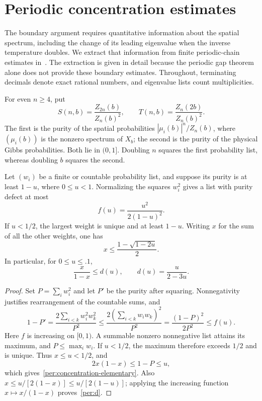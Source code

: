 \section{Periodic concentration estimates}\label{sec:periodic}

The boundary argument requires quantitative information about the
spatial spectrum, including the change of its leading eigenvalue when
the inverse temperature doubles.  We extract that information from
finite periodic-chain estimates in~\cite{periodic}.  The extraction is
given in detail because the periodic gap theorem alone does not provide
these boundary estimates.  Throughout, terminating decimals denote
exact rational numbers, and eigenvalue lists count multiplicities.

For even $n\ge4$, put
\begin{equation}\label{per:purities}
 S(n,b)=\frac{Z_{2n}(b)}{Z_n(b)^2},\qquad
 T(n,b)=\frac{Z_n(2b)}{Z_n(b)^2}.
\end{equation}
The first is the purity of the spatial probabilities
$|\mu_i(b)|^n/Z_n(b)$, where $(\mu_i(b))$ is the nonzero spectrum of
$X_b$; the second is the purity of the physical Gibbs probabilities.
Both lie in $(0,1]$.  Doubling $n$ squares the first probability list,
whereas doubling $b$ squares the second.

\begin{lemma}\label{per:purity}
Let $(w_i)$ be a finite or countable probability list, and suppose its
purity is at least $1-u$, where $0\le u<1$.  Normalizing the squares
$w_i^2$ gives a list with purity defect at most
\begin{equation}\label{per:f}
 f(u)=\frac{u^2}{2(1-u)^2}.
\end{equation}
If $u<1/2$, the largest weight is unique and at least $1-u$.  Writing
$x$ for the sum of all the other weights, one has
\begin{equation}\label{per:concentration-elementary}
 x\le\frac{1-\sqrt{1-2u}}2.
\end{equation}
In particular, for $0\le u\le .1$,
\begin{equation}\label{per:d}
 \frac{x}{1-x}\le d(u),\qquad d(u)=\frac{u}{2-3u}.
\end{equation}
\end{lemma}

\begin{proof}
Set $P=\sum_iw_i^2$ and let $P'$ be the purity after squaring.
Nonnegativity justifies rearrangement of the countable sums, and
\[
 1-P'=\frac{2\sum_{i<k}w_i^2w_k^2}{P^2}
 \le\frac{2(\sum_{i<k}w_iw_k)^2}{P^2}
 =\frac{(1-P)^2}{2P^2}\le f(u).
\]
Here $f$ is increasing on $[0,1)$.  A summable nonzero nonnegative list
attains its maximum, and $P\le\max_iw_i$.  If $u<1/2$, the maximum
therefore exceeds $1/2$ and is unique.  Thus $x\le u<1/2$, and
\[
 2x(1-x)\le 1-P\le u,
\]
which gives~\eqref{per:concentration-elementary}.  Also
$x\le u/[2(1-x)]\le u/[2(1-u)]$; applying the increasing function
$x\mapsto x/(1-x)$ proves~\eqref{per:d}.
\end{proof}


